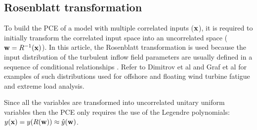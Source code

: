 \documentclass[preprint,12pt]{elsarticle}
\begin{document}
\subsection{Rosenblatt transformation}

To build the PCE of a model with multiple correlated inputs ($\mathbf{x}$), it is required to initially transform the correlated input space into an uncorrelated space ($\mathbf{w}=R^{-1}(\mathbf{x})$). In this article, the Rosenblatt transformation is used because the input distribution of the turbulent inflow field parameters are usually defined in a sequence of conditional relationships \cite{rosenblatt1952}. Refer to Dimitrov et al \cite{dimitrov2015model} and Graf et al \cite{graf2015high} for examples of such distributions used for offshore and floating wind turbine fatigue and extreme load analysis.







Since all the variables are transformed into uncorrelated unitary uniform variables then the PCE only requires the use of the Legendre polynomials: $y(\mathbf{x}) = y(R(\mathbf{w})) \approx \hat{y}(\mathbf{w})$. 



\end{document}
